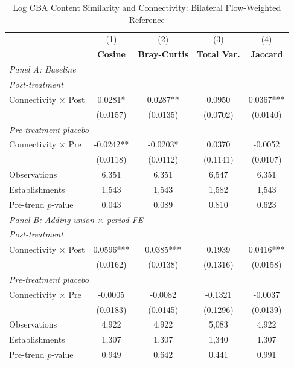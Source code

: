 \begin{table}[H]
\centering
\caption{Log CBA Content Similarity and Connectivity: Bilateral Flow-Weighted Reference}
\scriptsize
\setlength{\tabcolsep}{8pt}
\begin{tabular}{lcccc}
\hline\hline
 & (1) & (2) & (3) & (4) \\
 & \textbf{Cosine} & \textbf{Bray-Curtis} & \textbf{Total Var.} & \textbf{Jaccard} \\
\hline
\multicolumn{5}{l}{\textit{Panel A: Baseline}} \\
\multicolumn{5}{l}{\textit{Post-treatment}} \\
Connectivity $\times$ Post & 0.0281* & 0.0287** & 0.0950 & 0.0367*** \\
 & (0.0157) & (0.0135) & (0.0702) & (0.0140) \\
\multicolumn{5}{l}{\textit{Pre-treatment placebo}} \\
Connectivity $\times$ Pre & -0.0242** & -0.0203* & 0.0370 & -0.0052 \\
 & (0.0118) & (0.0112) & (0.1141) & (0.0107) \\
\hline
Observations &        6,351 &        6,351 &        6,547 &        6,351 \\
Establishments &        1,543 &        1,543 &        1,582 &        1,543 \\
Pre-trend $p$-value & 0.043 & 0.089 & 0.810 & 0.623 \\
\hline
\multicolumn{5}{l}{\textit{Panel B: Adding union $\times$ period FE}} \\
\multicolumn{5}{l}{\textit{Post-treatment}} \\
Connectivity $\times$ Post & 0.0596*** & 0.0385*** & 0.1939 & 0.0416*** \\
 & (0.0162) & (0.0138) & (0.1316) & (0.0158) \\
\multicolumn{5}{l}{\textit{Pre-treatment placebo}} \\
Connectivity $\times$ Pre & -0.0005 & -0.0082 & -0.1321 & -0.0037 \\
 & (0.0183) & (0.0145) & (0.1296) & (0.0139) \\
\hline
Observations &        4,922 &        4,922 &        5,083 &        4,922 \\
Establishments &        1,307 &        1,307 &        1,340 &        1,307 \\
Pre-trend $p$-value & 0.949 & 0.642 & 0.441 & 0.991 \\
\hline\hline
\end{tabular}
\begin{minipage}{\linewidth}

\end{minipage}
\end{table}
